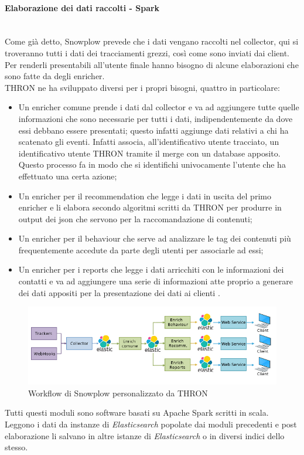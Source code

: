 \documentclass[a4paper, 12pt, twoside, openright]{book}
\begin{document}
\paragraph{Elaborazione dei dati raccolti - Spark}\mbox{} \\
Come già detto, Snowplow prevede che i dati vengano raccolti nel collector, qui si troveranno tutti i dati dei tracciamenti grezzi, così come sono inviati dai client. Per renderli presentabili all'utente finale hanno bisogno di alcune elaborazioni che sono fatte da degli enricher.\\
THRON ne ha sviluppato diversi per i propri bisogni, quattro in particolare:
\begin{itemize}
	\item Un enricher comune prende i dati dal collector e va ad aggiungere tutte quelle informazioni che sono necessarie per tutti i dati, indipendentemente da dove essi debbano essere presentati; questo infatti aggiunge dati relativi a chi ha scatenato gli eventi. Infatti associa, all'identificativo utente tracciato, un identificativo utente THRON tramite il merge con un database apposito. Questo processo fa in modo che si identifichi univocamente l'utente che ha effettuato una certa azione;
	\item Un enricher per il recommendation che legge i dati in uscita del primo enricher e li elabora secondo algoritmi scritti da THRON per produrre in output dei json che servono per la raccomandazione di contenuti;
	\item Un enricher per il behaviour che serve ad analizzare le tag dei contenuti più frequentemente accedute da parte degli utenti per associarle ad essi;
	\item Un enricher per i reports che legge i dati arricchiti con le informazioni dei contatti e va ad aggiungere una serie di informazioni atte proprio a generare dei dati appositi per la presentazione dei dati ai clienti .
\end{itemize}
\begin{figure}[H]
	\centering
	\label{snowplow-workflow-thron}	\includegraphics[width=1.0\textwidth]{images/snowplow-workflow-thron.jpg}
	\caption{Workflow di Snowplow personalizzato da THRON}
\end{figure} 
Tutti questi moduli sono software basati su Apache Spark scritti in scala. Leggono i dati da instanze di \textit{Elasticsearch} popolate dai moduli precedenti e post elaborazione li salvano in altre istanze di \textit{Elasticsearch} o in diversi indici dello stesso.\\
\end{document}
